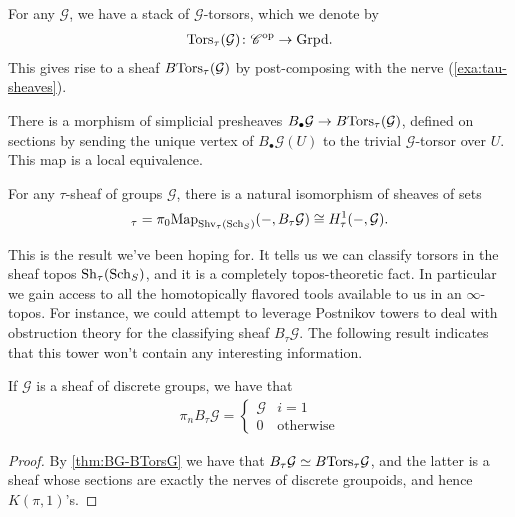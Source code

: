 \documentclass[11pt]{amsart}
\begin{document}
\begin{example}
For any $\mathcal{G}$, we have a stack of $\mathcal{G}$-torsors, which we denote by
\begin{align*}
    \mathrm{Tors}_\tau(\mathcal{G}) \colon \mathscr{C}^{\mathrm{op}} \to \mathrm{Grpd}.
\end{align*}
This gives rise to a sheaf $B\mathrm{Tors}_\tau(\mathcal{G})$ by post-composing with the nerve (\autoref{exa:tau-sheaves}).
\end{example}




\begin{theorem}\label{thm:BG-BTorsG} 
\cite[2.3.2]{AHW2}
There is a morphism of simplicial presheaves $B_\bullet \mathcal{G} \to B\mathrm{Tors}_\tau(\mathcal{G})$, defined on sections by sending the unique vertex of $B_\bullet \mathcal{G}(U)$ to the trivial $\mathcal{G}$-torsor over $U$. This map is a local equivalence.
\end{theorem}

\begin{corollary} For any $\tau$-sheaf of groups $\mathcal{G}$, there is a natural isomorphism of sheaves of sets
\begin{align*}
    [-, B_\tau \mathcal{G}]_\tau = \pi_0 \Map_{\Shv_\tau(\Sch_S)}(-,B_\tau \mathcal{G}) \cong H^1_\tau(-,\mathcal{G}).
\end{align*}
\end{corollary}

This is the result we've been hoping for. It tells us we can classify torsors in the sheaf topos $\mathrm{Sh}_\tau(\mathrm{Sch}_S)$, and it is a completely topos-theoretic fact. In particular we gain access to all the homotopically flavored tools available to us in an $\infty$-topos. For instance, we could attempt to leverage Postnikov towers to deal with obstruction theory for the classifying sheaf $B_\tau \mathcal{G}$. The following result indicates that this tower won't contain any interesting information.

\begin{example} If $\mathcal{G}$ is a sheaf of discrete groups, we have that
\begin{align*}
    \pi_n B_\tau \mathcal{G} = \begin{cases}
    \mathcal{G} & i=1 \\
    0 & \text{otherwise}
    \end{cases}
\end{align*}
\end{example}
\begin{proof} By \autoref{thm:BG-BTorsG} we have that $B_\tau \mathcal{G} \simeq B\mathrm{Tors}_\tau \mathcal{G}$, and the latter is a sheaf whose sections are exactly the nerves of discrete groupoids, and hence $K(\pi,1)$'s.
\end{proof}
\end{document}
